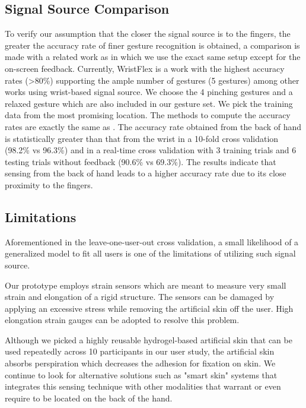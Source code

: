 \documentclass{sigchi}
\begin{document}
\subsection{Signal Source Comparison}
To verify our assumption that the closer the signal source is to the fingers, the greater the accuracy rate of finer gesture recognition is obtained, a comparison is made with a related work \cite{Dementyev:2014:WLG:2642918.2647396} as in which we use the exact same setup except for the on-screen feedback. Currently, WristFlex \cite{Dementyev:2014:WLG:2642918.2647396} is a work with the highest accuracy rates (\textgreater80\%) supporting the ample number of gestures (5 gestures) among other works using wrist-based signal source.
We choose the 4 pinching gestures and a relaxed gesture \cite{Dementyev:2014:WLG:2642918.2647396} which are also included in our gesture set. We pick the training data from the most promising location. The methods to compute the accuracy rates are exactly the same as \cite{Dementyev:2014:WLG:2642918.2647396}. The accuracy rate obtained from the back of hand is statistically greater than that from the wrist in a 10-fold cross validation (98.2\% vs 96.3\%) and in a real-time cross validation with 3 training trials and 6 testing trials without feedback (90.6\% vs 69.3\%). The results indicate that sensing from the back of hand leads to a higher accuracy rate due to its close proximity to the fingers.

\subsection{Limitations}
Aforementioned in the leave-one-user-out cross validation, a small likelihood of a generalized model to fit all users is one of the limitations of utilizing such signal source.

Our prototype employs strain sensors which are meant to measure very small strain and elongation of a rigid structure. The sensors can be damaged by applying an excessive stress while removing the artificial skin off the user. High elongation strain gauges can be adopted to resolve this problem.

Although we picked a highly reusable hydrogel-based artificial skin that can be used repeatedly across 10 participants in our user study, the artificial skin absorbs perspiration which decreases the adhesion for fixation on skin. We continue to look for alternative solutions such as "smart skin" systems that integrates this sensing technique with other modalities that warrant or even require to be located on the back of the hand.
\end{document}
